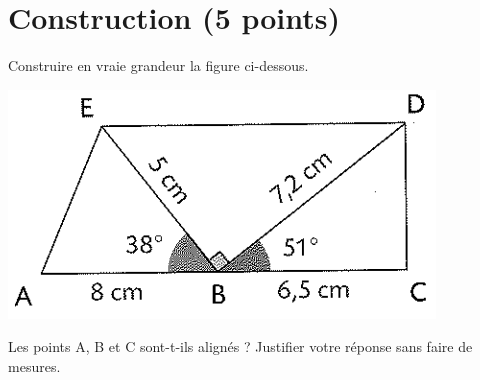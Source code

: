 \section{Construction (5 points)}

\begin{questions}
	\question[3] Construire en vraie grandeur la figure ci-dessous.
	\begin{center}
		\includegraphics[scale=0.7]{img/figure}
	\end{center}

	\question[2] 
		 Les points A, B et C sont-t-ils alignés ? Justifier votre réponse sans faire de mesures.

\end{questions}
